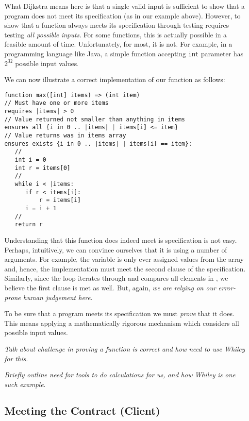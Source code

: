 What Dijkstra means here is that a single valid input is sufficient to show that a program does not meet its specification (as in our example above).  However, to show that a function always meets its specification through testing requires testing {\em all possible inputs}.  For some functions, this is actually possible in a feasible amount of time.  Unfortunately, for most, it is not.  For example, in a programming language like Java, a simple function accepting \lstinline{int} parameter has $2^32$ possible input values.

\begin{eg} We can now illustrate a correct implementation of our  function as follows:

\begin{lstlisting}
function max([int] items) => (int item) 
// Must have one or more items
requires |items| > 0
// Value returned not smaller than anything in items
ensures all {i in 0 .. |items| | items[i] <= item}
// Value returns was in items array
ensures exists {i in 0 .. |items| | items[i] == item}:
   //
   int i = 0
   int r = items[0]
   //
   while i < |items:
      if r < items[i]:
          r = items[i]
      i = i + 1
   //
   return r
\end{lstlisting}

Understanding that this function does indeed meet is specification is not easy.  Perhaps, intuitively, we can convince ourselves that it is using a number of arguments.  For example, the variable  is only ever assigned values from the  array and, hence, the implementation must meet the second  clause of the specification.  Similarly, since the loop iterates through and compares all elements in , we believe the first  clause is met as well.  But, again, {\em we are relying on our error-prone human judgement here}.  
\end{eg}


To be sure that a program meets its specification we must {\em prove} that it does.  This means applying a mathematically rigorous mechanism which considers all possible input values.

{\em Talk about challenge in proving a function is correct and how need to use Whiley for this.}

{\em Briefly outline need for tools to do calculations for us, and how Whiley is one such example}.

\subsection{Meeting the Contract (Client)}

